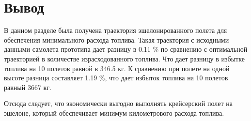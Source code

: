 \section{Вывод}
В данном разделе была получена траектория эшелонированного полета для
обеспечения минимального расхода топлива. Такая траектория с исходными данными
самолета прототипа дает разницу в 0.11 \% по сравнению с оптимальной
траекторией в количестве израсходованного топлива. Что дает разницу в избытке
топлива на 10 полетов равной в 346.5 кг. К сравнению при полете на одной высоте
разница составляет 1.19 \%, что дает избыток топлива на 10 полетов равный 3667 
кг.

Отсюда следует, что экономически выгодно выполнять крейсерский полет на
эшелоне, который обеспечивает минимум километрового расхода топлива. 

